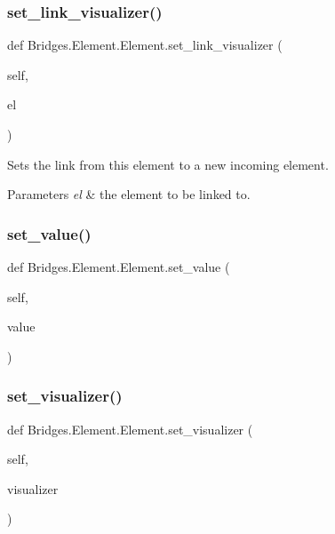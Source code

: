 \subsubsection{\texorpdfstring{set\+\_\+link\+\_\+visualizer()}{set\_link\_visualizer()}}
{\footnotesize\ttfamily def Bridges.\+Element.\+Element.\+set\+\_\+link\+\_\+visualizer (\begin{DoxyParamCaption}\item[{}]{self,  }\item[{}]{el }\end{DoxyParamCaption})}



Sets the link from this element to a new incoming element. 


\begin{DoxyParams}{Parameters}
{\em el} & the element to be linked to. \\
\hline
\end{DoxyParams}
\mbox{\label{class_bridges_1_1_element_1_1_element_a25bd0c22aed9063505cca514ecd0943d}} 
\subsubsection{\texorpdfstring{set\+\_\+value()}{set\_value()}}
{\footnotesize\ttfamily def Bridges.\+Element.\+Element.\+set\+\_\+value (\begin{DoxyParamCaption}\item[{}]{self,  }\item[{}]{value }\end{DoxyParamCaption})}

\mbox{\label{class_bridges_1_1_element_1_1_element_a43898806f4cc199664375bc690fea41e}} 
\subsubsection{\texorpdfstring{set\+\_\+visualizer()}{set\_visualizer()}}
{\footnotesize\ttfamily def Bridges.\+Element.\+Element.\+set\+\_\+visualizer (\begin{DoxyParamCaption}\item[{}]{self,  }\item[{}]{visualizer }\end{DoxyParamCaption})}



